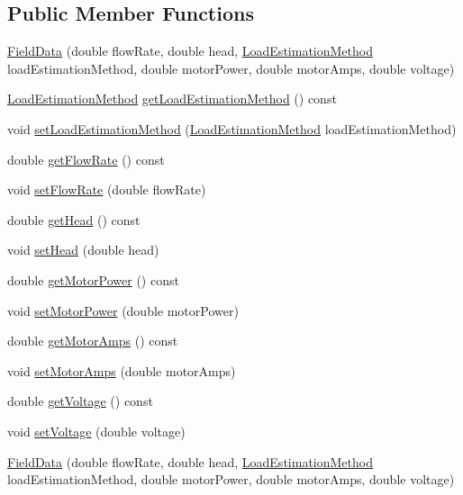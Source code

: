 \subsection*{Public Member Functions}
\begin{DoxyCompactItemize}
\item 
\hyperlink{class_field_data_a33158a88d05e657bd2c8007bae875454}{Field\+Data} (double flow\+Rate, double head, \hyperlink{class_field_data_a424e89914ba5684c01bb269dbe3312fd}{Load\+Estimation\+Method} load\+Estimation\+Method, double motor\+Power, double motor\+Amps, double voltage)
\item 
\hyperlink{class_field_data_a424e89914ba5684c01bb269dbe3312fd}{Load\+Estimation\+Method} \hyperlink{class_field_data_ae213fa76dd005d7fd251ef26beecd311}{get\+Load\+Estimation\+Method} () const
\item 
void \hyperlink{class_field_data_a7d1103b1832956d96146cbe26fb34a6d}{set\+Load\+Estimation\+Method} (\hyperlink{class_field_data_a424e89914ba5684c01bb269dbe3312fd}{Load\+Estimation\+Method} load\+Estimation\+Method)
\item 
double \hyperlink{class_field_data_a59b3261a5162b002d7b73a2d35561bd0}{get\+Flow\+Rate} () const
\item 
void \hyperlink{class_field_data_ad25c3e5a76b4e493e82d3f70cc3c0ed9}{set\+Flow\+Rate} (double flow\+Rate)
\item 
double \hyperlink{class_field_data_ac3e8e0b2de226c858b6c92cdb454bd0d}{get\+Head} () const
\item 
void \hyperlink{class_field_data_ac72a4f958930000bab0e2b772ee26711}{set\+Head} (double head)
\item 
double \hyperlink{class_field_data_a3e8e1bf84bbd00b9b52b803147968c81}{get\+Motor\+Power} () const
\item 
void \hyperlink{class_field_data_a078e6b4899e7046008ccc9de59bd0272}{set\+Motor\+Power} (double motor\+Power)
\item 
double \hyperlink{class_field_data_ad2b4fffb00fa7cfa6f69487e1034989a}{get\+Motor\+Amps} () const
\item 
void \hyperlink{class_field_data_a4f9373e8a215853b08bbe6a1915fb1a9}{set\+Motor\+Amps} (double motor\+Amps)
\item 
double \hyperlink{class_field_data_a1e8a55965e6cbd8c7b49c0dd5fbee002}{get\+Voltage} () const
\item 
void \hyperlink{class_field_data_a02735cc6956a3fce97bab645ef15dabc}{set\+Voltage} (double voltage)
\item 
\hyperlink{class_field_data_a33158a88d05e657bd2c8007bae875454}{Field\+Data} (double flow\+Rate, double head, \hyperlink{class_field_data_a424e89914ba5684c01bb269dbe3312fd}{Load\+Estimation\+Method} load\+Estimation\+Method, double motor\+Power, double motor\+Amps, double voltage)

\end{DoxyCompactItemize}
